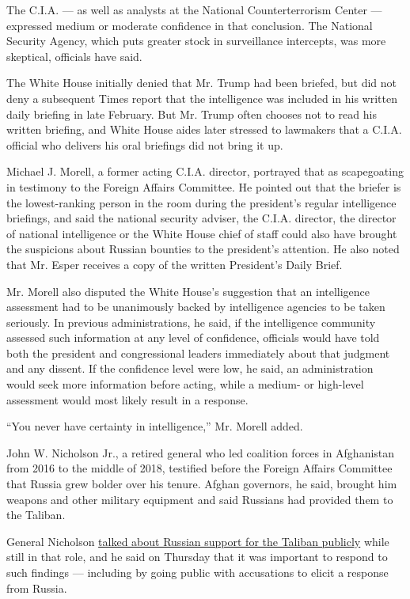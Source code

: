 The C.I.A. --- as well as analysts at the National Counterterrorism
Center --- expressed medium or moderate confidence in that conclusion.
The National Security Agency, which puts greater stock in surveillance
intercepts, was more skeptical, officials have said.

The White House initially denied that Mr. Trump had been briefed, but
did not deny a subsequent Times report that the intelligence was
included in his written daily briefing in late February. But Mr. Trump
often chooses not to read his written briefing, and White House aides
later stressed to lawmakers that a C.I.A. official who delivers his oral
briefings did not bring it up.

Michael J. Morell, a former acting C.I.A. director, portrayed that as
scapegoating in testimony to the Foreign Affairs Committee. He pointed
out that the briefer is the lowest-ranking person in the room during the
president's regular intelligence briefings, and said the national
security adviser, the C.I.A. director, the director of national
intelligence or the White House chief of staff could also have brought
the suspicions about Russian bounties to the president's attention. He
also noted that Mr. Esper receives a copy of the written President's
Daily Brief.

Mr. Morell also disputed the White House's suggestion that an
intelligence assessment had to be unanimously backed by intelligence
agencies to be taken seriously. In previous administrations, he said, if
the intelligence community assessed such information at any level of
confidence, officials would have told both the president and
congressional leaders immediately about that judgment and any dissent.
If the confidence level were low, he said, an administration would seek
more information before acting, while a medium- or high-level assessment
would most likely result in a response.

``You never have certainty in intelligence,'' Mr. Morell added.

John W. Nicholson Jr., a retired general who led coalition forces in
Afghanistan from 2016 to the middle of 2018, testified before the
Foreign Affairs Committee that Russia grew bolder over his tenure.
Afghan governors, he said, brought him weapons and other military
equipment and said Russians had provided them to the Taliban.

General Nicholson
\href{https://www.bbc.com/news/world-asia-43500299}{talked about Russian
support for the Taliban publicly} while still in that role, and he said
on Thursday that it was important to respond to such findings ---
including by going public with accusations to elicit a response from
Russia.

